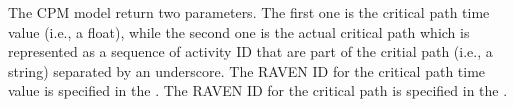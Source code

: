 The CPM model return two parameters. The first one is the critical path time value (i.e., a float),
while the second one is the actual critical path which is represented as a sequence of activity ID
that are part of the critial path (i.e., a string) separated by an underscore.
The RAVEN ID for the critical path time value is specified in the .
The RAVEN ID for the critical path is specified in the .


